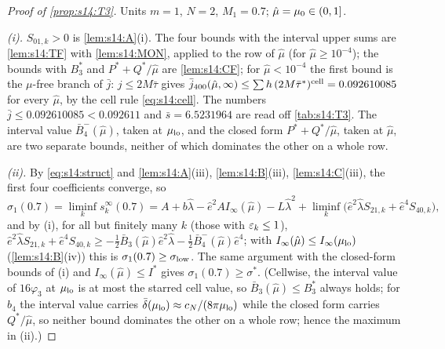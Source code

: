 \begin{proof}[Proof of \cref{prop:s14:T3}]
Units $m=1$, $N=2$, $M_1=0.7$; $\hat\mu=\mu_0\in(0,1]$.

\emph{(i).} $S_{01,k}>0$ is \cref{lem:s14:A}(i). The four bounds with the interval upper sums are \cref{lem:s14:TF} with \cref{lem:s14:MON}, applied to the row of $\hat\mu$ (for $\hat\mu\ge10^{-4}$); the bounds with $B_3^*$ and $P^*+Q^*/\hat\mu$ are \cref{lem:s14:CF}; for $\hat\mu<10^{-4}$ the first bound is the $\mu$-free branch of $\bar j$: $j\le2M\bar\tau$ gives $\bar j_{400}(\hat\mu,\infty)\le\sum h\,(2M\bar\tau^*)^{\rm cell}=0.092610085$ for every $\hat\mu$, by the cell rule \eqref{eq:s14:cell}. The numbers $\bar j\le0.092610085<0.092611$ and $\bar s=6.5231964$ are read off \cref{tab:s14:T3}. The interval value $\bar B_4^-(\hat\mu)$, taken at $\mu_{\rm lo}$, and the closed form $P^*+Q^*/\hat\mu$, taken at $\hat\mu$, are two separate bounds, neither of which dominates the other on a whole row.

\emph{(ii).} By \eqref{eq:s14:struct} and \cref{lem:s14:A}(iii), \cref{lem:s14:B}(iii), \cref{lem:s14:C}(iii), the first four coefficients converge, so
\[
\sigma_1(0.7)=\liminf_ks^\infty_k(0.7)=A+b\hat\lambda-\hat e^2AI_\infty(\hat\mu)-L\hat\lambda^2+\liminf_k\big(\hat e^2\hat\lambda S_{21,k}+\hat e^4S_{40,k}\big),
\]
and by (i), for all but finitely many $k$ (those with $\varepsilon_k\le1$), $\hat e^2\hat\lambda S_{21,k}+\hat e^4S_{40,k}\ge-\frac12\bar B_3(\hat\mu)\hat e^2\hat\lambda-\frac12\bar B_4^-(\hat\mu)\hat e^4$; with $I_\infty(\hat\mu)\le I_\infty(\mu_{\rm lo})$ (\cref{lem:s14:B}(iv)) this is $\sigma_1(0.7)\ge\sigma_{\rm low}$. The same argument with the closed-form bounds of (i) and $I_\infty(\hat\mu)\le I^*$ gives $\sigma_1(0.7)\ge\sigma^*$. (Cellwise, the interval value of $16\varphi_3$ at $\mu_{\rm lo}$ is at most the starred cell value, so $\bar B_3(\hat\mu)\le B_3^*$ always holds; for $b_4$ the interval value carries $\bar\delta(\mu_{\rm lo})\approx c_N/(8\pi\mu_{\rm lo})$ while the closed form carries $Q^*/\hat\mu$, so neither bound dominates the other on a whole row; hence the maximum in (ii).)


\end{proof}
